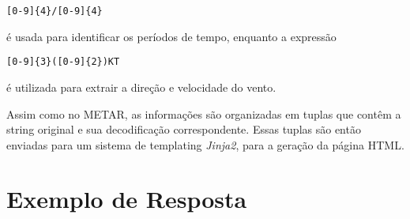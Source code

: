 \begin{verbatim}
[0-9]{4}/[0-9]{4} 
\end{verbatim}

é usada para identificar os períodos de tempo, enquanto a expressão

\begin{verbatim}
[0-9]{3}([0-9]{2})KT
\end{verbatim}

é utilizada para extrair a direção e velocidade do vento.

Assim como no METAR, as informações são organizadas em tuplas que contêm a string original
e sua decodificação correspondente. Essas tuplas são então enviadas para um sistema de
templating \textit{Jinja2}, para a geração da página HTML.

\section{Exemplo de Resposta}


